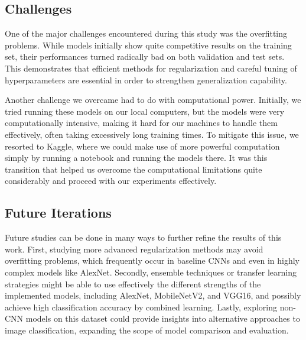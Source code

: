 \documentclass[conference]{IEEEtran}
\begin{document}
\subsection{Challenges}

One of the major challenges encountered during this study was the overfitting problems. While models initially show quite competitive results on the training set, their performances turned radically bad on both validation and test sets. This demonstrates that efficient methods for regularization and careful tuning of hyperparameters are essential in order to strengthen generalization capability.

Another challenge we overcame had to do with computational power. Initially, we tried running these models on our local computers, but the models were very computationally intensive, making it hard for our machines to handle them effectively, often taking excessively long training times. To mitigate this issue, we resorted to Kaggle, where we could make use of more powerful computation simply by running a notebook and running the models there. It was this transition that helped us overcome the computational limitations quite considerably and proceed with our experiments effectively.

\subsection{Future Iterations}

Future studies can be done in many ways to further refine the results of this work. First, studying more advanced regularization methods may avoid overfitting problems, which frequently occur in baseline CNNs and even in highly complex models like AlexNet. Secondly, ensemble techniques or transfer learning strategies might be able to use effectively the different strengths of the implemented models, including AlexNet, MobileNetV2, and VGG16, and possibly achieve high classification accuracy by combined learning. Lastly, exploring non-CNN models on this dataset could provide insights into alternative approaches to image classification, expanding the scope of model comparison and evaluation.

\printbibliography
\end{document}
